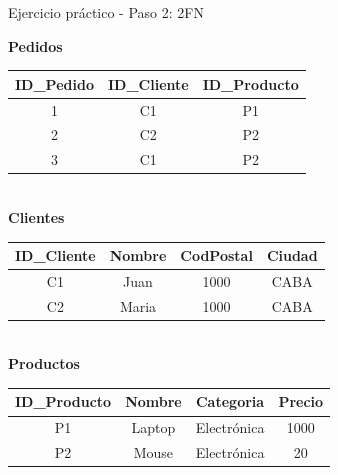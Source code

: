 \documentclass{beamer}
\begin{document}
\begin{frame}{Ejercicio práctico - Paso 2: 2FN}
    \begin{center}
    \textbf{Pedidos}\\[0.1cm]
    \begin{tabular}{ccc}
        \hline
        ID\_Pedido & ID\_Cliente & ID\_Producto \\
        \hline
        1 & C1 & P1 \\
        2 & C2 & P2 \\
        3 & C1 & P2 \\
        \hline
    \end{tabular}
    \vspace{0.4cm}
    \textbf{\\Clientes}\\[0.1cm]
    \begin{tabular}{cccc}
        \hline
        ID\_Cliente & Nombre & CodPostal & Ciudad \\
        \hline
        C1 & Juan & 1000 & CABA \\
        C2 & Maria & 1000 & CABA \\
        \hline
    \end{tabular}
    \vspace{0.4cm}
    \textbf{\\Productos}\\[0.1cm]
    \begin{tabular}{cccc}
        \hline
        ID\_Producto & Nombre & Categoria & Precio \\
        \hline
        P1 & Laptop & Electrónica & 1000 \\
        P2 & Mouse & Electrónica & 20 \\
        \hline
    \end{tabular}
    \end{center}
\end{frame}
\end{document}
